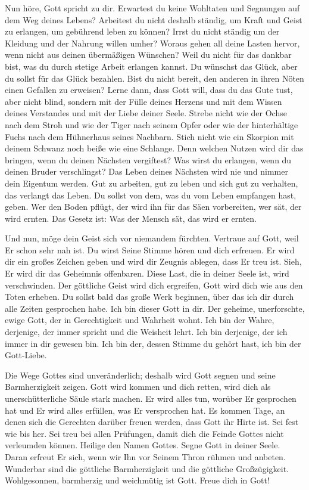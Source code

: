         Nun höre, Gott spricht zu dir. Erwartest du keine Wohltaten und Segnungen auf dem Weg deines Lebens? Arbeitest du nicht deshalb ständig, um Kraft und Geist zu erlangen, um gebührend leben zu können? Irrst du nicht ständig um der Kleidung und der Nahrung willen umher? Woraus gehen all deine Lasten hervor, wenn nicht aus deinen übermäßigen Wünschen? Weil du nicht für das dankbar bist, was du durch stetige Arbeit erlangen kannst. Du wünschst das Glück, aber du sollst für das Glück bezahlen. Bist du nicht bereit, den anderen in ihren Nöten einen Gefallen zu erweisen? Lerne dann, dass Gott will, dass du das Gute tust, aber nicht blind, sondern mit der Fülle deines Herzens und mit dem Wissen deines Verstandes und mit der Liebe deiner Seele. Strebe nicht wie der Ochse nach dem Stroh und wie der Tiger nach seinem Opfer oder wie der hinterhältige Fuchs nach dem Hühnerhaus seines Nachbarn. Stich nicht wie ein Skorpion mit deinem Schwanz noch beiße wie eine Schlange. Denn welchen Nutzen wird dir das bringen, wenn du deinen Nächsten vergiftest? Was wirst du erlangen, wenn du deinen Bruder verschlingst? Das Leben deines Nächsten wird nie und nimmer dein Eigentum werden. Gut zu arbeiten, gut zu leben und sich gut zu verhalten, das verlangt das Leben. Du sollst von dem, was du vom Leben empfangen hast, geben. Wer den Boden pflügt, der wird ihn für das Säen vorbereiten, wer sät, der wird ernten. Das Gesetz ist: Was der Mensch sät, das wird er ernten. 
        
        Und nun, möge dein Geist sich vor niemandem fürchten. Vertraue auf Gott, weil Er schon sehr nah ist. Du wirst Seine Stimme hören und dich erfreuen. Er wird dir ein großes Zeichen geben und wird dir Zeugnis ablegen, dass Er treu ist. Sieh, Er wird dir das Geheimnis offenbaren. Diese Last, die in deiner Seele ist, wird verschwinden. Der göttliche Geist wird dich ergreifen, Gott wird dich wie aus den Toten erheben. Du sollst bald das große Werk beginnen, über das ich dir durch alle Zeiten gesprochen habe. Ich bin dieser Gott in dir. Der geheime, unerforschte, ewige Gott, der in Gerechtigkeit und Wahrheit wohnt. Ich bin der Wahre, derjenige, der immer spricht und die Weisheit lehrt. Ich bin derjenige, der ich immer in dir gewesen bin. Ich bin der, dessen Stimme du gehört hast, ich bin der Gott-Liebe.
        
        Die Wege Gottes sind unveränderlich; deshalb wird Gott segnen und seine Barmherzigkeit zeigen. Gott wird kommen und dich retten, wird dich als unerschütterliche Säule stark machen. Er wird alles tun, worüber Er gesprochen hat und Er wird alles erfüllen, was Er versprochen hat. Es kommen Tage, an denen sich die Gerechten darüber freuen werden, dass Gott ihr Hirte ist. Sei fest wie bis her. Sei treu bei allen Prüfungen, damit dich die Feinde Gottes nicht verleumden können. Heilige den Namen Gottes. Segne Gott in deiner Seele. Daran erfreut Er sich, wenn wir Ihn vor Seinem Thron rühmen und anbeten. Wunderbar sind die göttliche Barmherzigkeit und die göttliche Großzügigkeit. Wohlgesonnen, barmherzig und weichmütig ist Gott. Freue dich in Gott!
        
